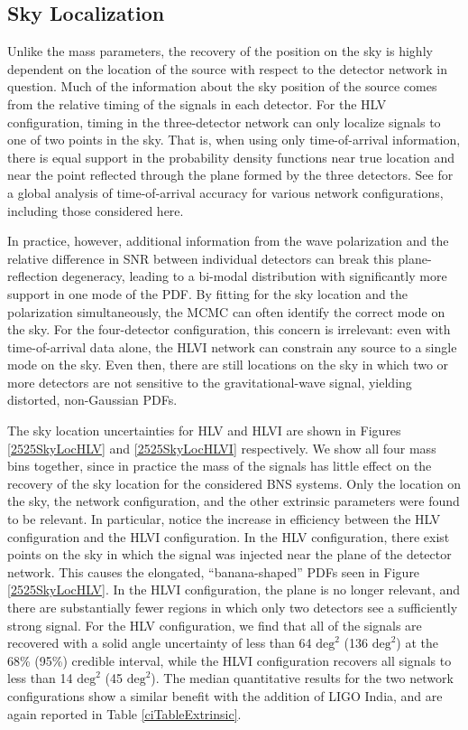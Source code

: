 \documentclass[11pt,a4paper]{emulateapj} 
\begin{document}
\subsection{Sky Localization}
\label{skySection}
 
Unlike the mass parameters, the recovery of the position on the sky is
highly dependent on the location of the source with respect to the
detector network in question.  Much of the information about the sky
position of the source comes from the relative timing of the signals
in each detector.  For the HLV configuration, timing in the
three-detector network can only localize signals to one of two points
in the sky.  That is, when using only time-of-arrival information,
there is equal support in the probability density functions near true
location and near the point reflected through the plane formed by the
three detectors.  See \cite{Fairhurst2011} for a global analysis of
time-of-arrival accuracy for various network configurations, including
those considered here.
  
  
In practice, however, additional information from the wave
polarization and the relative difference in SNR between individual
detectors can break this plane-reflection degeneracy, leading to a
bi-modal distribution with significantly more support in one mode of
the PDF.  By fitting for the sky location and the polarization
simultaneously, the MCMC can often identify the correct mode on the
sky.  For the four-detector configuration, this concern is irrelevant:
even with time-of-arrival data alone, the HLVI network can constrain
any source to a single mode on the sky.  Even then, there are still
locations on the sky in which two or more detectors are not sensitive
to the gravitational-wave signal, yielding distorted, non-Gaussian
PDFs.

The sky location uncertainties for HLV and HLVI are shown in Figures
\ref{2525SkyLocHLV} and \ref{2525SkyLocHLVI} respectively.  We show
all four mass bins together, since in practice the mass of the signals
has little effect on the recovery of the sky location for the
considered BNS systems.  Only the location on the sky, the network
configuration, and the other extrinsic parameters were found to be
relevant.  In particular, notice the increase in efficiency between
the HLV configuration and the HLVI configuration.  In the HLV
configuration, there exist points on the sky in which the signal was
injected near the plane of the detector network.  This causes the
elongated, ``banana-shaped'' PDFs seen in Figure \ref{2525SkyLocHLV}.
In the HLVI configuration, the plane is no longer relevant, and there
are substantially fewer regions in which only two detectors see a
sufficiently strong signal.  For the HLV configuration, we find that
 all of the signals are recovered with
a solid angle uncertainty of less than 64 $\mathrm{deg}^2$ (136 $\mathrm{deg}^2$)
at the 68\% (95\%) credible interval, while the HLVI configuration 
recovers all signals to less than 14 $\mathrm{deg}^2$ (45 $\mathrm{deg}^2$).
The median quantitative results for the two network configurations show a similar
 benefit with the addition of LIGO India, and are again reported in Table \ref{ciTableExtrinsic}. 
\end{document}
